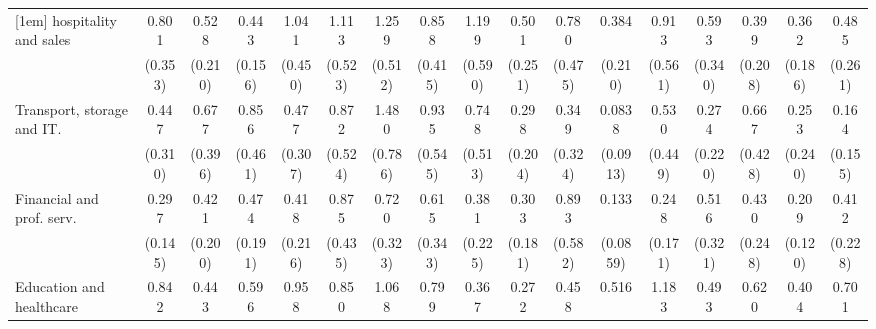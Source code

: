 {\begin{tabular}{l*{16}{c}}
[1em]
hospitality and sales&       0.801         &       0.528         &       0.443\sym{*}  &       1.041         &       1.113         &       1.259         &       0.858         &       1.199         &       0.501         &       0.780         &       0.384         &       0.913         &       0.593         &       0.399         &       0.362\sym{*}  &       0.485         \\
                    &     (0.353)         &     (0.210)         &     (0.156)         &     (0.450)         &     (0.523)         &     (0.512)         &     (0.415)         &     (0.590)         &     (0.251)         &     (0.475)         &     (0.210)         &     (0.561)         &     (0.340)         &     (0.208)         &     (0.186)         &     (0.261)         \\
[1em]
Transport, storage and IT.&       0.447         &       0.677         &       0.856         &       0.477         &       0.872         &       1.480         &       0.935         &       0.748         &       0.298         &       0.349         &      0.0838\sym{*}  &       0.530         &       0.274         &       0.667         &       0.253         &       0.164         \\
                    &     (0.310)         &     (0.396)         &     (0.461)         &     (0.307)         &     (0.524)         &     (0.786)         &     (0.545)         &     (0.513)         &     (0.204)         &     (0.324)         &    (0.0913)         &     (0.449)         &     (0.220)         &     (0.428)         &     (0.240)         &     (0.155)         \\
[1em]
Financial and prof. serv.&       0.297\sym{*}  &       0.421         &       0.474         &       0.418         &       0.875         &       0.720         &       0.615         &       0.381         &       0.303\sym{*}  &       0.893         &       0.133\sym{**} &       0.248\sym{*}  &       0.516         &       0.430         &       0.209\sym{**} &       0.412         \\
                    &     (0.145)         &     (0.200)         &     (0.191)         &     (0.216)         &     (0.435)         &     (0.323)         &     (0.343)         &     (0.225)         &     (0.181)         &     (0.582)         &    (0.0859)         &     (0.171)         &     (0.321)         &     (0.248)         &     (0.120)         &     (0.228)         \\
[1em]
Education and healthcare&       0.842         &       0.443         &       0.596         &       0.958         &       0.850         &       1.068         &       0.799         &       0.367         &       0.272\sym{**} &       0.458         &       0.516         &       1.183         &       0.493         &       0.620         &       0.404         &       0.701         \\

\end{tabular}}

